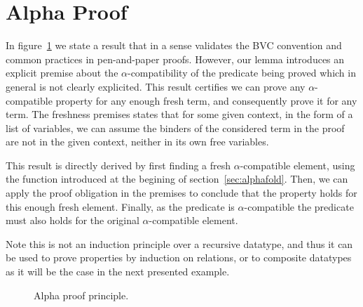 \documentclass{book}
\newcommand\Wider[2][3em]{%
\makebox[\linewidth][c]{%
  \begin{minipage}{\dimexpr\textwidth+#1\relax}
  \raggedright#2
  \end{minipage}%
  }%
}
\newcommand{\alp}{\ensuremath{\alpha}}
\begin{document}
{\section{Alpha Proof}

In figure~\ref{fig:alphaproof} we state a result that in a sense validates the BVC convention and common practices in pen-and-paper proofs. However, our lemma introduces an explicit premise about the \alp-compatibility of the predicate being proved which in general is not clearly explicited. This result certifies we can prove any \alp-compatible property for any enough fresh term, and consequently prove it for any term. The freshness premises states that for some given context, in the form of a list of variables, we can assume the binders of the considered term in the proof are not in the given context, neither in its own free variables.

This result is directly derived by first finding a fresh \alp-compatible element, using the function introduced at the begining of section~\ref{sec:alphafold}. Then, we can apply the proof obligation in the premises to conclude that the property holds for this enough fresh element. Finally, as the predicate is \alp-compatible the predicate must also holds for the original \alp-compatible element.

Note this is not an induction principle over a recursive datatype, and thus it can be used to prove properties by induction on relations, or to composite datatypes as it will be the case in the next presented example.


\begin{figure}[h!]
  
  
  \caption{Alpha proof principle.}
\label{fig:alphaproof}
\end{figure}






  
  



  
}
\end{document}
